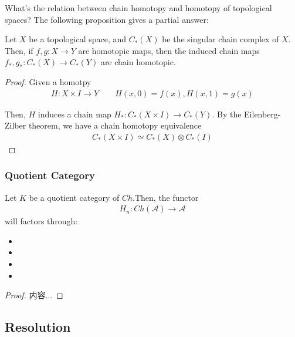 \documentclass[Total.tex]{subfiles}
\begin{document}
					What's the relation between chain homotopy and homotopy of topological spaces? The following proposition gives a partial answer:
					\begin{proposition}
						Let $X$ be a topological space, and $C_*(X)$ be the singular chain complex of $X$. Then, if $f,g:X\rightarrow Y$ are homotopic maps, then the induced chain maps $f_*,g_*:C_*(X)\rightarrow C_*(Y)$ are chain homotopic.
					\end{proposition}
					\begin{proof}
						Given a homotpy \begin{gather*}
							H:X\times I\rightarrow Y\qquad H(x,0)=f(x),H(x,1)=g(x)
						\end{gather*}

						Then, $H$ induces a chain map $H_*:C_*(X\times I)\rightarrow C_*(Y)$. By the Eilenberg-Zilber theorem, we have a chain homotopy equivalence
						\begin{gather*}
							C_*(X\times I)\simeq C_*(X)\otimes C_*(I)
						\end{gather*}
					\end{proof}
				\subsubsection{Quotient Category}
					\begin{proposition}
						Let $K$ be a quotient category of $Ch$.Then, the functor
						\begin{gather*}
							H_n:Ch(\mathcal{A})\rightarrow \mathcal{A}
						\end{gather*}
						will factors through:
						\begin{itemize}
							\item 
							\item 
							\item 
							\item 
						\end{itemize}
					\end{proposition}
					\begin{proof}
						内容...
					\end{proof}
			\subsection{Resolution}
				
\end{document}
